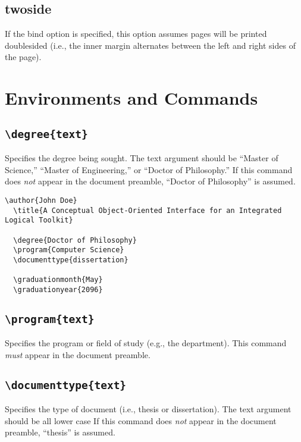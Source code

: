 \documentclass[10pt]{article}
\newcommand{\option}[1]{#1}
\newcommand{\command}[1]{\texttt{\textbackslash#1}}
\begin{document}
\subsection{\option{twoside}}
If the bind option is specified, this option assumes pages will be printed doublesided (i.e., the inner margin alternates between the left and right sides of the page).

\section{Environments and Commands}

\subsection{\command{degree\{text\}}}
Specifies the degree being sought.
The text argument should be ``Master of Science,'' ``Master of Engineering,'' or ``Doctor of Philosophy.''
If this command does \emph{not} appear in the document preamble, ``Doctor of Philosophy'' is assumed.

\begin{lstlisting}[gobble=2,float=t,caption={Sample document preamble showing the \command{degree}, \command{program}, \command{documenttype}, \command{graduationmonth}, and \command{graduationyear} commands.}]
  \author{John Doe}
  \title{A Conceptual Object-Oriented Interface for an Integrated Logical Toolkit}
  
  \degree{Doctor of Philosophy}
  \program{Computer Science}
  \documenttype{dissertation}
  
  \graduationmonth{May}
  \graduationyear{2096}
\end{lstlisting}

\subsection{\command{program\{text\}}}
Specifies the program or field of study (e.g., the department).
This command \emph{must} appear in the document preamble.

\subsection{\command{documenttype\{text\}}}
Specifies the type of document (i.e., thesis or dissertation).
The text argument should be all lower case
If this command does \emph{not} appear in the document preamble, ``thesis'' is assumed.
\end{document}
